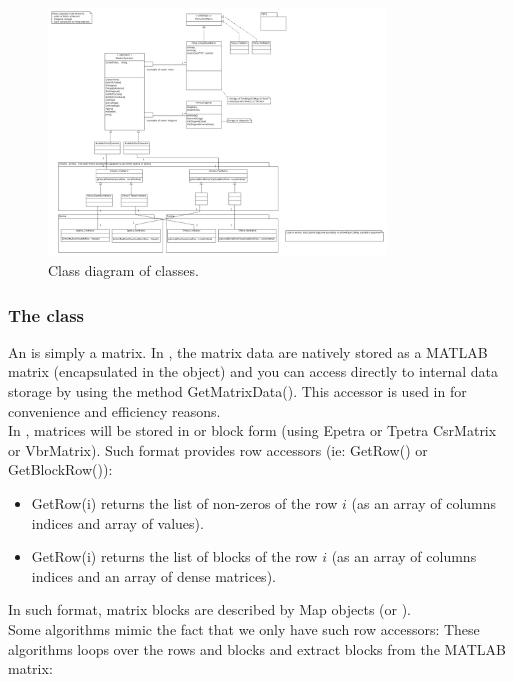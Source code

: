 \begin{figure}
\centering  \includegraphics[angle=90,width=0.8\textwidth]{figs/MueLuOperatorClassDiagram.png}
  \caption{Class diagram of \Operator classes.}
  \label{fig:current:MueLuOperatorClassDiagram}
\end{figure}

\subsubsection{The \Operator class}
An \Operator is simply a matrix. In \muemat, the matrix data are natively stored as a MATLAB matrix (encapsulated in the \Operator object) and you can access directly to internal data storage by using the method GetMatrixData().
This accessor is used in \muemat for convenience and efficiency reasons.\\

In \mloo, matrices will be stored in \point or block form (using Epetra or Tpetra CsrMatrix or VbrMatrix). Such format provides row accessors (ie: GetRow() or GetBlockRow()):
\begin{itemize}
\item GetRow(i) returns the list of non-zeros of the row $i$ (as an array of columns indices and array of values).
\item GetRow(i) returns the list of blocks of the row $i$ (as an array of columns indices and an array of dense matrices).
\end{itemize}
In such format, matrix blocks are described by Map objects (\EpetraMap or \TpetraMap).\\

Some \muemat algorithms mimic the fact that we only have such row accessors: These algorithms loops over the rows and blocks and extract blocks from the MATLAB matrix:

